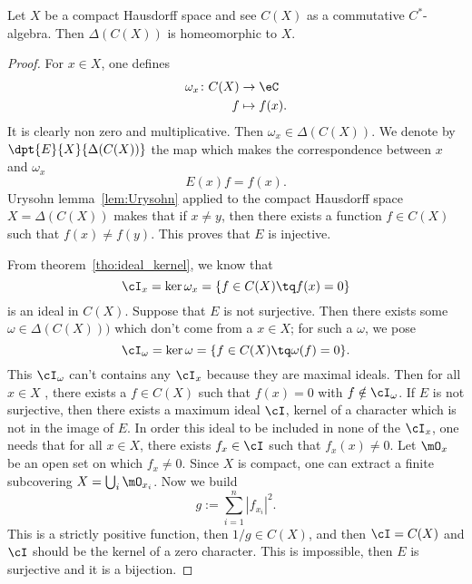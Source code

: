\begin{proposition}     \label{PropcomCstarDelCeqX}
	Let $X$ be a compact Hausdorff space and see $C(X)$ as a commutative $C^*$-algebra. Then $\Delta(C(X))$ is homeomorphic to $X$.\label{prop:comHauffhomeo}
\end{proposition}

\begin{proof}
	For $x\in X$, one defines
	\begin{equation}
		\begin{aligned}
			\omega_x \colon C(X) & \to \eC       \\
			f                    & \mapsto f(x).
		\end{aligned}
	\end{equation}
	It is clearly non zero and multiplicative. Then $\omega_x\in\Delta(C(X))$. We denote by $ \dpt{E}{X}{\Delta(C(X))}$ the map which makes the correspondence between $x$ and $\omega_x$
	\[
		E(x)f=f(x).
	\]
	Urysohn lemma~\ref{lem:Urysohn} applied to the compact Hausdorff space $X=\Delta(C(X))$ makes that if $x\neq y$, then there exists a function $f\in C(X)$ such that $f(x)\neq f(y)$. This proves that $E$ is injective.

	From theorem~\ref{tho:ideal_kernel}, we know that
	\[
		\cI_x=\ker\omega_x=\{f\in C(X)\tq f(x)=0\}
	\]
	is an ideal in $C(X)$. Suppose that $E$ is not surjective. Then there exists some $\omega\in\Delta(C(X)))$ which don't come from a $x\in X$; for such a $\omega$, we pose
	\[
		\cI_{\omega}=\ker\omega=\{f\in C(X)\tq \omega(f)=0\}.
	\]
	This $\cI_{\omega}$ can't contains any $\cI_x$ because they are maximal ideals. Then for all $x\in X$ , there exists a $f\in C(X)$ such that $f(x)=0$ with $f\notin\cI_{\omega}$. If $E$ is not surjective, then there exists a maximum ideal $\cI$, kernel of a character which is not in the image of $E$. In order this ideal to be included in none of the $\cI_x$, one needs that for all $x\in X$, there exists $f_x\in\cI$ such that $f_x(x)\neq 0$. Let $\mO_x$ be an open set on which $f_x\neq 0$. Since $X$ is compact, one can extract a finite subcovering $X=\bigcup_i\mO_{x_i}$. Now we build
	\[
		g:=\sum_{i=1}^n|f_{x_i}|^2.
	\]
	This is a strictly positive function, then $1/g\in C(X)$, and then $\cI=C(X)$ and $\cI$ should be the kernel of a zero character. This is impossible, then $E$ is surjective and it is a bijection.


\end{proof}

